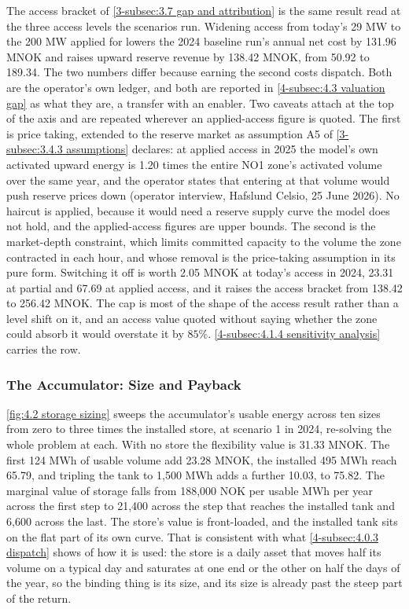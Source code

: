 The access bracket of \autoref{3-subsec:3.7 gap and attribution} is the same result read at the three access levels the scenarios run. Widening access from today's 29 MW to the 200 MW applied for lowers the 2024 baseline run's annual net cost by 131.96 MNOK and raises upward reserve revenue by 138.42 MNOK, from 50.92 to 189.34. The two numbers differ because earning the second costs dispatch. Both are the operator's own ledger, and both are reported in \autoref{4-subsec:4.3 valuation gap} as what they are, a transfer with an enabler. Two caveats attach at the top of the axis and are repeated wherever an applied-access figure is quoted. The first is price taking, extended to the reserve market as assumption A5 of \autoref{3-subsec:3.4.3 assumptions} declares: at applied access in 2025 the model's own activated upward energy is 1.20 times the entire NO1 zone's activated volume over the same year, and the operator states that entering at that volume would push reserve prices down (operator interview, Hafslund Celsio, 25 June 2026). No haircut is applied, because it would need a reserve supply curve the model does not hold, and the applied-access figures are upper bounds. The second is the market-depth constraint, which limits committed capacity to the volume the zone contracted in each hour, and whose removal is the price-taking assumption in its pure form. Switching it off is worth 2.05 MNOK at today's access in 2024, 23.31 at partial and 67.69 at applied access, and it raises the access bracket from 138.42 to 256.42 MNOK. The cap is most of the shape of the access result rather than a level shift on it, and an access value quoted without saying whether the zone could absorb it would overstate it by $85\%$. \autoref{4-subsec:4.1.4 sensitivity analysis} carries the row.

\subsubsection{The Accumulator: Size and Payback}
\label{4-subsec:4.1.5 storage sizing}

\autoref{fig:4.2 storage sizing} sweeps the accumulator's usable energy across ten sizes from zero to three times the installed store, at scenario 1 in 2024, re-solving the whole problem at each. With no store the flexibility value is 31.33 MNOK. The first 124 MWh of usable volume add 23.28 MNOK, the installed 495 MWh reach 65.79, and tripling the tank to 1{,}500 MWh adds a further 10.03, to 75.82. The marginal value of storage falls from 188{,}000 NOK per usable MWh per year across the first step to 21{,}400 across the step that reaches the installed tank and 6{,}600 across the last. The store's value is front-loaded, and the installed tank sits on the flat part of its own curve. That is consistent with what \autoref{4-subsec:4.0.3 dispatch} shows of how it is used: the store is a daily asset that moves half its volume on a typical day and saturates at one end or the other on half the days of the year, so the binding thing is its size, and its size is already past the steep part of the return.


